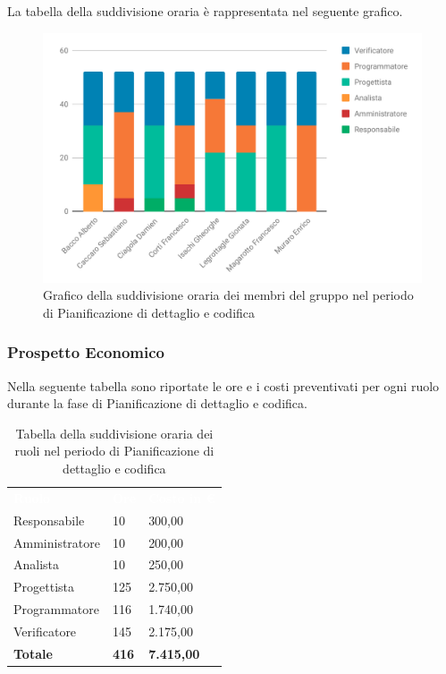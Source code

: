 La tabella della suddivisione oraria è rappresentata nel seguente grafico.
\begin{figure}[H]
	\includegraphics[width=1\linewidth]{Preventivo/grafici/PC1.pdf}
	\caption{Grafico della suddivisione oraria dei membri del gruppo nel periodo di Pianificazione di dettaglio e codifica}
\end{figure}

\subsubsection{Prospetto Economico}
Nella seguente tabella sono riportate le ore e i costi preventivati per ogni ruolo durante la fase di Pianificazione di dettaglio e codifica.


\begin{table}[H]	
	\begin{center}
	    \begin{tabular}{C{4cm}C{1cm}C{3,5cm}}
			\textcolor{white}{\textbf{Ruolo}} & \textcolor{white}{\textbf{Ore}} & \textcolor{white}{\textbf{Costo in €}}
			\\ 
			Responsabile & 10 & 300,00 \\
			Amministratore & 10 & 200,00 \\
			Analista & 10 & 250,00 \\
			Progettista & 125 & 2.750,00 \\
			Programmatore & 116 & 1.740,00 \\
			Verificatore & 145 & 2.175,00 \\
			\textbf{Totale} & \textbf{416} & \textbf{7.415,00} \\
		\end{tabular}
	    \caption{Tabella della suddivisione oraria dei ruoli nel periodo di Pianificazione di dettaglio e codifica} \label{tab:tabellaRuoliPianificazione di dettaglio e codifica} 
	\end{center}
\end{table}


